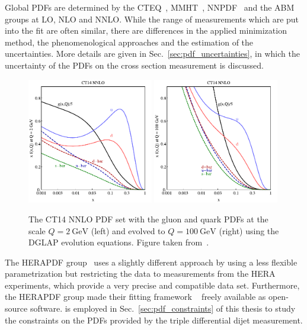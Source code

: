 Global PDFs are determined by the CTEQ~\cite{Dulat:2015mca},
MMHT~\cite{Harland-Lang:2014zoa}, NNPDF~\cite{Ball:2014uwa} and the
ABM~\cite{Alekhin:2013nda} groups at LO, NLO and NNLO. While the range of
measurements which are put into the fit are often similar, there are differences
in the applied minimization method, the phenomenological approaches and the
estimation of the uncertainties. More details are given in
Sec.~\ref{sec:pdf_uncertainties}, in which the uncertainty of the PDFs on the
cross section measurement is discussed.

\begin{figure}[htbp] 
    \centering
    \includegraphics[width=0.49\textwidth]{figures/theoretical_foundations/ct14_2.pdf}\hfill
    \includegraphics[width=0.49\textwidth]{figures/theoretical_foundations/ct14_100.pdf}
    \caption[CT14 NNLO PDF set]{The CT14 NNLO PDF set with the gluon and quark
        PDFs at the scale $Q=\SI{2}{\GeV}$ (left) and evolved to $Q=\SI{100}{\GeV}$
    (right) using the DGLAP evolution equations. Figure taken
    from~\cite{Dulat:2015mca}.}
    \label{fig:ct14_parton_distributions} 
\end{figure}

The HERAPDF group~\cite{Abramowicz:2015mha} uses a slightly different approach
by using a less flexible parametrization but restricting the data to
measurements from the HERA experiments, which provide a very precise and
compatible data set. Furthermore, the HERAPDF group made their fitting framework
\xfitter~\cite{Alekhin:2014irh} freely available as open-source software.
\xfitter is employed in Sec.~\ref{sec:pdf_constraints} of this thesis to study
the constraints on the PDFs provided by the triple differential dijet
measurement.

